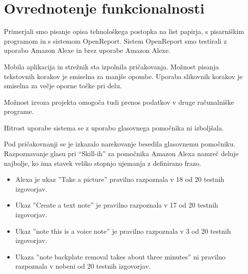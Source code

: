 \documentclass[a4paper, 12pt]{book}
\begin{document}
% 
% 
% 
% 




\section{Ovrednotenje funkcionalnosti}


Primerjali smo pisanje opisa tehnološkega postopka na list papirja, s pisarniškim programom in s sistemom OpenReport.
Sistem OpenReport smo testirali z uporabo Amazon Alexe in brez uporabe Amazon Alexe.

Mobila aplikacija in strežnik sta izpolnila pričakovanja.
Možnost pisanja tekstovnih korakov je smiselna za manjše opombe.
Uporaba slikovnih korakov je smiselna za večje oporne točke pri delu.

Možnost izvoza projekta omogoča tudi prenos podatkov v druge računalniške programe.

Hitrost uporabe sistema se z uporabo glasovnega pomočnika ni izboljšala.

Pod pričakovnanji se je izkazalo narekovanje besedila glasovnemu pomočniku.
Razpoznavanje glasu pri \enquote{Skill-ih} za pomočnika Amazon Alexa namreč deluje najbolje, ko ima stavek veliko stopnjo ujemanja z definirano frazo.
\begin{itemize}
	\item Alexa je ukaz ''Take a picture'' pravilno razpoznala v 18 od 20 testnih izgovorjav.
	\item Ukaz ''Create a text note'' je pravilno razpoznala v 17 od 20 testnih izgovorjav.
	\item Ukaz ''note this is a voice note'' je pravilno razpoznala v 3 od 20 testnih izgovorjav.
	\item Ukaza ''note backplate removal takes about three minutes'' ni pravilno razpoznala v nobeni od 20 testnih izgovorjav.
\end{itemize}
\end{document}
